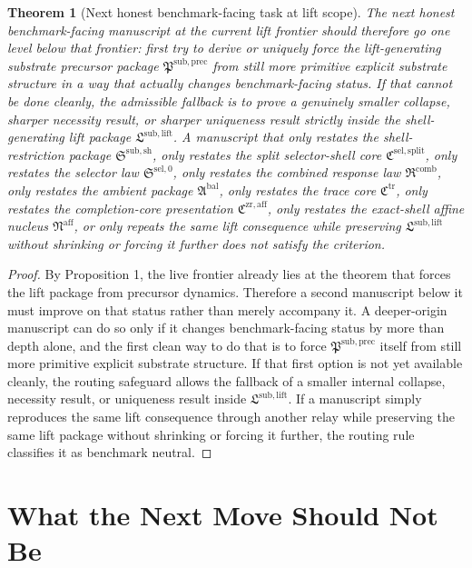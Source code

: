 \documentclass[11pt]{article}
\newcommand{\CompletionCore}{\mathfrak C^{\mathrm{zr,aff}}}
\newcommand{\TraceCore}{\mathfrak C^{\mathrm{tr}}}
\newcommand{\AffineNucleus}{\mathfrak N^{\mathrm{aff}}}
\newcommand{\AmbientPackage}{\mathfrak A^{\mathrm{bal}}}
\newcommand{\CombinedLaw}{\mathfrak R^{\mathrm{comb}}}
\newcommand{\SelectorLaw}{\mathfrak S^{\mathrm{sel},0}}
\newcommand{\SelectorCore}{\mathfrak C^{\mathrm{sel,split}}}
\newcommand{\ShellRestriction}{\mathfrak S^{\mathrm{sub,sh}}}
\newcommand{\LiftPackage}{\mathfrak L^{\mathrm{sub,lift}}}
\newcommand{\PrecursorPackage}{\mathfrak P^{\mathrm{sub,prec}}}
\newtheorem{theorem}{Theorem}
\begin{document}
\begin{theorem}[Next honest benchmark-facing task at lift scope]
The next honest benchmark-facing manuscript at the current lift frontier should therefore go one level below that frontier: first try to derive or uniquely force the lift-generating substrate precursor package \(\PrecursorPackage\) from still more primitive explicit substrate structure in a way that actually changes benchmark-facing status. If that cannot be done cleanly, the admissible fallback is to prove a genuinely smaller collapse, sharper necessity result, or sharper uniqueness result strictly inside the shell-generating lift package \(\LiftPackage\). A manuscript that only restates the shell-restriction package \(\ShellRestriction\), only restates the split selector-shell core \(\SelectorCore\), only restates the selector law \(\SelectorLaw\), only restates the combined response law \(\CombinedLaw\), only restates the ambient package \(\AmbientPackage\), only restates the trace core \(\TraceCore\), only restates the completion-core presentation \(\CompletionCore\), only restates the exact-shell affine nucleus \(\AffineNucleus\), or only repeats the same lift consequence while preserving \(\LiftPackage\) without shrinking or forcing it further does not satisfy the criterion.
\end{theorem}

\begin{proof}
By Proposition 1, the live frontier already lies at the theorem that forces the lift package from precursor dynamics. Therefore a second manuscript below it must improve on that status rather than merely accompany it. A deeper-origin manuscript can do so only if it changes benchmark-facing status by more than depth alone, and the first clean way to do that is to force \(\PrecursorPackage\) itself from still more primitive explicit substrate structure. If that first option is not yet available cleanly, the routing safeguard allows the fallback of a smaller internal collapse, necessity result, or uniqueness result inside \(\LiftPackage\). If a manuscript simply reproduces the same lift consequence through another relay while preserving the same lift package without shrinking or forcing it further, the routing rule classifies it as benchmark neutral.
\end{proof}

\section{What the Next Move Should Not Be}
\end{document}
